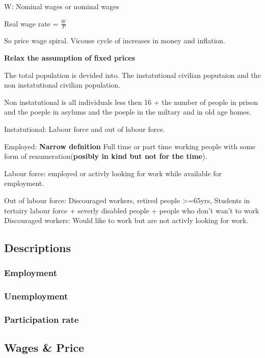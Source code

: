 \documentclass[twocolumn]{article}
\begin{document}
W: Nominal wages or nominal wages

Real wage rate = \(\frac{W}{P}\)

So price wage spiral. Vicouse cycle of increases in money and inflation.

\textbf{Relax the assumption of fixed prices}

The total population is devided into. The instatutional civilian
poputaion and the non instatutional civilian population.

Non instatutional is all individuals less then 16 + the number of people
in prison and the poeple in asylums and the poeple in the miltary and in
old age homes.

Instatutional: Labour force and out of labour force.

Employed: \textbf{Narrow defnition} Full time or part time working
people with some form of renumeration(\textbf{posibly in kind but not
for the time}).

Labour force: employed or activly looking for work while available for
employment.

Out of labour force: Discouraged workers, retired people
\textgreater{}=65yrs, Students in tertairy labour force + severly
disabled people + people who don't wan't to work Discouraged workers:
Would like to work but are not activly looking for work.

\hypertarget{descriptions}{%
\subsection{Descriptions}\label{descriptions}}

\hypertarget{employment}{%
\subsubsection{Employment}\label{employment}}

\hypertarget{unemployment}{%
\subsubsection{Unemployment}\label{unemployment}}

\hypertarget{participation-rate}{%
\subsubsection{Participation rate}\label{participation-rate}}

\hypertarget{wages-price}{%
\subsection{Wages \& Price}\label{wages-price}}
\end{document}
